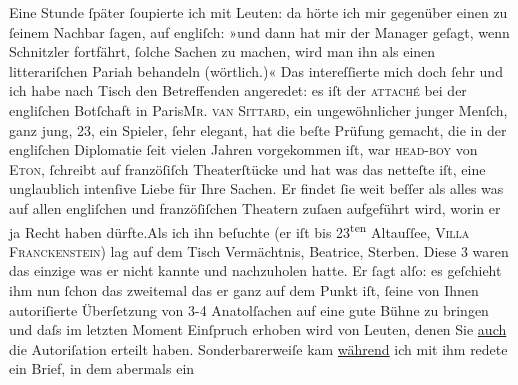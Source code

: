 \pstart
           Eine Stunde ſpäter ſoupierte ich mit Leuten: da hörte ich mir gegenüber einen  zu ſeinem Nachbar ſagen, auf engliſch: »und dann
               hat mir der Manager geſagt, wenn Schnitzler fortfährt, {\pb}ſolche Sachen zu machen, wird man
               ihn als einen litterariſchen Pariah behandeln (wörtlich.)« Das intereſſierte mich
               doch ſehr und ich habe nach Tisch den Betreffenden angeredet: es iſt der \textsc{attaché} bei der engliſchen
                  Botſchaft in Paris\textsc{Mr. van Sittard}, ein ungewöhnlicher junger Menſch, ganz jung, 23, ein Spieler, ſehr elegant,
               hat die beſte Prüfung gemacht, die in {\pb}der engliſchen Diplomatie ſeit
               vielen Jahren vorgekommen iſt, war \textsc{head-boy} von \textsc{Eton}, ſchreibt auf franzöſiſch Theaterſtücke und hat was das netteſte iſt, eine
               unglaublich intenſive Liebe für Ihre Sachen. Er findet ſie weit beſſer als alles was
               auf allen engliſchen und franzöſiſchen Theatern zuſa{\geminationm}en
               aufgeführt wird, worin er ja Recht haben dürfte.\hspace*{1.5em}Als
               ich ihn beſuchte (er {\pb}iſt bis
                     23\textsuperscript{ten}{ }Altauſſee, \textsc{Villa
                     Franckenſtein}) lag auf dem Tisch Vermächtnis, Beatrice, Sterben. Diese 3 waren das einzige was er nicht kannte und nachzuholen
               hatte. Er ſagt alſo: es geſchieht ihm nun ſchon das zweitemal das er ganz auf dem
               Punkt iſt, ſeine von Ihnen autoriſierte Überſetzung von 3-4 Anatolſachen auf eine {\pb}gute Bühne zu bringen und daſs im
               letzten Moment Einſpruch erhoben wird von Leuten, denen Sie \uline{auch} die Autoriſation erteilt haben. Sonderbarerweiſe kam \uline{während} ich mit ihm redete ein Brief, in dem abermals ein
